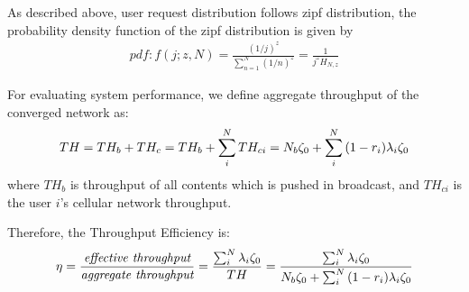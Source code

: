 \documentclass[conference]{IEEEtran}
\begin{document}
As described above, user request distribution follows zipf distribution, the probability density function of the zipf distribution is given by
\begin{equation}\label{zipf_pdf}
\begin{aligned}
pdf: f(j;z,N)=\frac{(1/j)^z}{\sum_{n=1}^N{(1/n)^z}}=\frac{1}{j^zH_{N,z}}
\end{aligned}
\end{equation}

%

For evaluating system performance, we define aggregate throughput of the converged network as:
 \begin{dmath}
  TH=TH_b+TH_c\\
    =TH_{b}+\sum_i^N{TH_{ci}}\\
    =N_b\zeta_0+\sum_i^N{(1-r_i)\lambda_i\zeta_0}\\
  \end{dmath}
 where $TH_b$ is throughput of all contents which is pushed in broadcast, and $TH_{ci}$ is the user $i$'s cellular network throughput.
 
 Therefore, the Throughput Efficiency is: 
 \begin{dmath}
    \eta=\frac{\textit {effective throughput} }{\textit {aggregate throughput} }\\
    =\frac{\sum_i^N{\lambda_i\zeta_0}}{TH}\\
    =\frac{\sum_i^N{\lambda_i\zeta_0}}{N_b\zeta_0+\sum_i^N{(1-r_i)\lambda_i\zeta_0}}\\
    \label{eq:th}
  \end{dmath}
  
\end{document}
